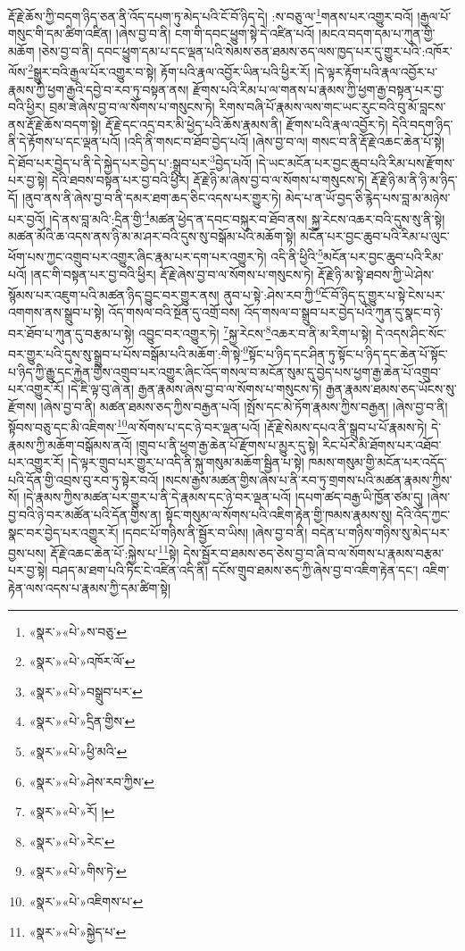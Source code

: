 རྡོ་རྗེ་ཆོས་ཀྱི་བདག་ཉིད་ཅན་ནི་འོད་དཔག་ཏུ་མེད་པའི་ངོ་བོ་ཉིད་དེ། :ས་བཅུ་ལ་\footnote{«སྣར་»«པེ་»ས་བཅུ་}གནས་པར་འགྱུར་བའོ། །རྒྱལ་པོ་གསུང་གི་དམ་ཚིག་འཛིན། །ཞེས་བྱ་བ་ནི། ངག་གི་དབང་ཕྱུག་སྟེ་དེ་འཛིན་པའོ། །མངའ་བདག་དམ་པ་ཀུན་གྱི་མཆོག །ཅེས་བྱ་བ་ནི། དབང་ཕྱུག་དམ་པ་དང་ལྡན་པའི་སེམས་ཅན་ཐམས་ཅད་ལས་ཁྱད་པར་དུ་གྱུར་པའི་:འཁོར་ལོས་\footnote{«སྣར་»«པེ་»འཁོར་ལོ་}སྒྱུར་བའི་རྒྱལ་པོར་འགྱུར་བ་སྟེ། རྟོག་པའི་རྣལ་འབྱོར་ཡིན་པའི་ཕྱིར་རོ། །དེ་ལྟར་རྟོག་པའི་རྣལ་འབྱོར་པ་རྣམས་ཀྱི་ཕྱག་རྒྱའི་དབྱེ་བ་རབ་ཏུ་བསྟན་ནས། རྫོགས་པའི་རིམ་པ་ལ་གནས་པ་རྣམས་ཀྱི་ཕྱག་རྒྱ་བསྟན་པར་བྱ་བའི་ཕྱིར། བྲམ་ཟེ་ཞེས་བྱ་བ་ལ་སོགས་པ་གསུངས་ཏེ། རིགས་བཞི་པོ་རྣམས་ལས་གང་ཡང་རུང་བའི་བུ་མོ་བླངས་ནས་རྡོ་རྗེ་ཆོས་བདག་སྟེ། རྡོ་རྗེ་དང་འདྲ་བར་མི་ཕྱེད་པའི་ཆོས་རྣམས་ནི། རྫོགས་པའི་རྣལ་འབྱོར་ཏེ། དེའི་བདག་ཉིད་ནི་དེ་རྟོགས་པ་དང་ལྡན་པའོ། །འདི་ནི་གསང་བ་ཐོབ་བྱེད་པའོ། །ཞེས་བྱ་བ་ལ། གསང་བ་ནི་རྡོ་རྗེ་འཆང་ཆེན་པོ་སྟེ། དེ་ཐོབ་པར་བྱེད་པ་ནི་དེ་སྐྱེད་པར་བྱེད་པ་:སྒྲུབ་པར་\footnote{«སྣར་»«པེ་»བསྒྲུབ་པར་}བྱེད་པའོ། །དེ་ཡང་མངོན་པར་བྱང་ཆུབ་པའི་རིམ་པས་རྫོགས་པར་བྱ་སྟེ། དེའི་ཐབས་བསྟན་པར་བྱ་བའི་ཕྱིར། རྡོ་རྗེ་ཉི་མ་ཞེས་བྱ་བ་ལ་སོགས་པ་གསུངས་ཏེ། རྡོ་རྗེ་ཉི་མ་ནི་ཉི་མ་ཉིད་དོ། །ནུབ་ནས་ནི་ཞེས་བྱ་བ་ནི་དམར་ཐག་ཆད་ཅིང་འདས་པར་གྱུར་ཏེ། མེད་པ་ན་ཡོ་བྱད་ཅི་རྙེད་པས་བླ་མ་མཉེས་པར་བྱའོ། །དེ་ནས་བླ་མའི་:དྲིན་གྱི་\footnote{«སྣར་»«པེ་»དྲིན་གྱིས་}མཚན་ཕྱེད་ན་དབང་བསྐུར་བ་ཐོབ་ནས། སྐྱ་རེངས་འཆར་བའི་དུས་སུ་ནི་སྟེ། མཚན་མོའི་ཆ་འདས་ནས་ཉི་མ་མ་ཤར་བའི་དུས་སུ་བསྒོམ་པའི་མཆོག་སྟེ། མངོན་པར་བྱང་ཆུབ་པའི་རིམ་པ་ལུང་ཕོག་པས་ཀྱང་འགྲུབ་པར་འགྱུར་ཞིང་རྣམ་པར་དག་པར་འགྱུར་ཏེ། འདི་ནི་ཕྱིའི་\footnote{«སྣར་»«པེ་»ཕྱི་མའི་}མངོན་པར་བྱང་ཆུབ་པའི་རིམ་པའོ། །ནང་གི་བསྟན་པར་བྱ་བའི་ཕྱིར། རྡོ་རྗེ་ཞེས་བྱ་བ་ལ་སོགས་པ་གསུངས་ཏེ། རྡོ་རྗེ་ཉི་མ་སྟེ་ཐབས་ཀྱི་ཡེ་ཤེས་སྙོམས་པར་འཇུག་པའི་མཚན་ཉིད་བྱུང་བར་གྱུར་ནས། ནུབ་པ་སྟེ་:ཤེས་རབ་ཀྱི་\footnote{«སྣར་»«པེ་»ཤེས་རབ་ཀྱིས་}ངོ་བོ་ཉིད་དུ་གྱུར་པ་སྟེ་ངེས་པར་འགགས་ནས་སྒྲུབ་པ་སྟེ། འོད་གསལ་བའི་སྔོན་དུ་འགྲོ་བས། འོད་གསལ་བ་སྒྲུབ་པར་བྱེད་པའི་ཀུན་དུ་སྣང་བ་ཉེ་བར་ཐོབ་པ་ཀུན་དུ་བརྩམ་པ་སྟེ། འབྱུང་བར་འགྱུར་ཏེ། \footnote{«སྣར་»«པེ་»རོ། །}སྐྱ་རེངས་\footnote{«སྣར་»«པེ་»རེང་}འཆར་བ་ནི་མ་རིག་པ་སྟེ། དེ་འདས་ཤིང་སོང་བར་གྱུར་པའི་དུས་སུ་སྒྲུབ་པ་པོས་བསྒོམ་པའི་མཆོག་:གི་སྟེ་\footnote{«སྣར་»«པེ་»གིས་ཏེ་}སྟོང་པ་ཉིད་དང་ཤིན་ཏུ་སྟོང་པ་ཉིད་དང་ཆེན་པོ་སྟོང་པ་ཉིད་ཀྱི་རྒྱུ་དང་རྐྱེན་གྱིས་འགྲུབ་པར་འགྱུར་ཞིང་འོད་གསལ་བ་མངོན་སུམ་དུ་བྱེད་པས་ཕྱག་རྒྱ་ཆེན་པོ་འགྲུབ་པར་འགྱུར་རོ། །དེ་ཇི་ལྟ་བུ་ཞེ་ན། རྒྱན་རྣམས་ཞེས་བྱ་བ་ལ་སོགས་པ་གསུངས་ཏེ། རྒྱན་རྣམས་ཐམས་ཅད་ཡོངས་སུ་རྫོགས། །ཞེས་བྱ་བ་ནི། མཚན་ཐམས་ཅད་ཀྱིས་བརྒྱན་པའོ། །སྤོས་དང་མེ་ཏོག་རྣམས་ཀྱིས་བརྒྱན། །ཞེས་བྱ་བ་ནི། སྟོབས་བཅུ་དང་མི་འཇིགས་\footnote{«སྣར་»«པེ་»འཇིགས་པ་}ལ་སོགས་པ་དང་ཉེ་བར་ལྡན་པའོ། །རྡོ་རྗེ་སེམས་དཔའ་ནི་སྒྲུབ་པ་པོ་རྣམས་ཏེ། དེ་རྣམས་ཀྱི་མཆོག་བསྒོམས་ནའོ། །གྲུབ་པ་ནི་ཕྱག་རྒྱ་ཆེན་པོ་རྫོགས་པ་མྱུར་དུ་སྟེ། རིང་པོར་མི་ཐོགས་པར་འཐོབ་པར་འགྱུར་རོ། །དེ་ལྟར་གྲུབ་པར་གྱུར་པ་འདི་ནི་སྐུ་གསུམ་མཆོག་སྦྱིན་པ་སྟེ། ཁམས་གསུམ་གྱི་མངོན་པར་འདོད་པའི་དོན་གྱི་འབྲས་བུ་རབ་ཏུ་སྟེར་བའོ། །སངས་རྒྱས་མཚན་གྱིས་ཞེས་པ་ནི་རབ་ཏུ་གྲགས་པའི་མཚན་རྣམས་ཀྱིས་སོ། །དེ་རྣམས་ཀྱིས་མཚན་པར་གྱུར་པ་ནི་དེ་རྣམས་དང་ཉེ་བར་ལྡན་པའོ། །དཔག་ཚད་བརྒྱ་ཡི་ཁྱོན་ཙམ་དུ། །ཞེས་བྱ་བའི་ཉེ་བར་མཚོན་པའི་དོན་གྱིས་ན། སྟོང་གསུམ་ལ་སོགས་པའི་འཇིག་རྟེན་གྱི་ཁམས་རྣམས་སུ། དེའི་འོད་ཀྱང་སྣང་བར་བྱེད་པར་འགྱུར་རོ། །དབང་པོ་གཉིས་ནི་སྦྱོར་བ་ཡིས། །ཞེས་བྱ་བ་ནི། བདེན་པ་གཉིས་གཉིས་སུ་མེད་པར་བྱས་པས། རྡོ་རྗེ་འཆང་ཆེན་པོ་:སྐྱེས་པ་\footnote{«སྣར་»«པེ་»སྐྱེད་པ་}སྟེ། དེས་སྦྱོར་བ་ཐམས་ཅད་ཅེས་བྱ་བ་ཞི་བ་ལ་སོགས་པ་རྣམས་བརྩམ་པར་བྱ་སྟེ། བཤད་མ་ཐག་པའི་ཏིང་ངེ་འཛིན་འདི་ནི། དངོས་གྲུབ་ཐམས་ཅད་ཀྱི་ཞེས་བྱ་བ་འཇིག་རྟེན་དང་། འཇིག་རྟེན་ལས་འདས་པ་རྣམས་ཀྱི་དམ་ཚིག་སྟེ། 